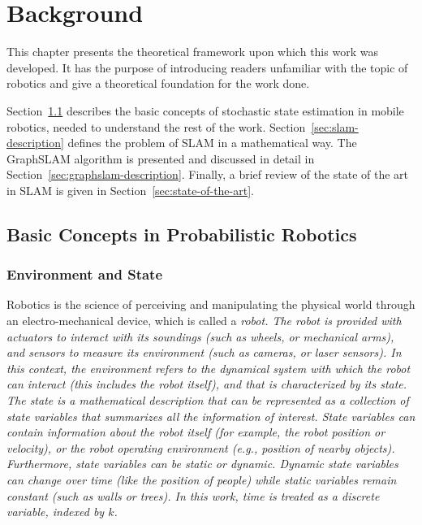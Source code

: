 \chapter{Background}
\label{chap:antecedents}

This chapter presents the theoretical framework upon which this work was developed. It has the purpose of introducing readers unfamiliar with the topic of robotics and give a theoretical foundation for the work done.

Section~\ref{sec:basic-concepts} describes the basic concepts of stochastic state estimation in mobile robotics, needed to understand the rest of the work. Section~\ref{sec:slam-description} defines the problem of SLAM in a mathematical way. The GraphSLAM algorithm is presented and discussed in detail in Section~\ref{sec:graphslam-description}. Finally, a brief review of the state of the art in SLAM is given in Section~\ref{sec:state-of-the-art}.

\section{Basic Concepts in Probabilistic Robotics} 
\label{sec:basic-concepts}

\subsection{Environment and State}

Robotics is the science of perceiving and manipulating the physical world through an electro-mechanical device, which is called a \it{robot}. The robot is provided with actuators to interact with its soundings (such as wheels, or mechanical arms), and sensors to measure its environment (such as cameras, or laser sensors). In this context, the \it{environment} refers to the dynamical system with which the robot can interact (this includes the robot itself), and that is characterized by its \it{state}. The state is a mathematical description that can be represented as a collection of \it{state variables} that summarizes all the information of interest. State variables can contain information about the robot itself (for example, the robot position or velocity), or the robot operating environment (e.g., position of nearby objects). Furthermore, state variables can be \it{static} or \it{dynamic}. Dynamic state variables can change over time (like the position of people) while static variables remain constant (such as walls or trees). In this work, time is treated as a discrete variable, indexed by $k$.

